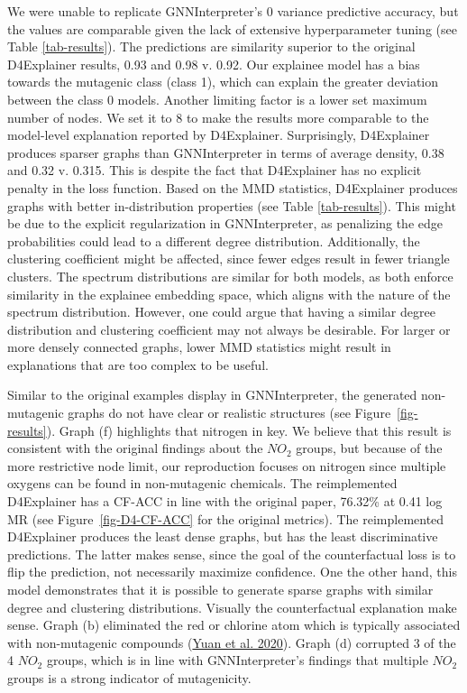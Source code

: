 \documentclass[
  11pt,
  letterpaper,
]{article}
\begin{document}
\quad We were unable to replicate GNNInterpreter's 0 variance predictive
accuracy, but the values are comparable given the lack of extensive
hyperparameter tuning (see Table \ref{tab-results}). The predictions are
similarity superior to the original D4Explainer results, 0.93 and 0.98
v. 0.92. Our explainee model has a bias towards the mutagenic class
(class 1), which can explain the greater deviation between the class 0
models. Another limiting factor is a lower set maximum number of nodes.
We set it to 8 to make the results more comparable to the model-level
explanation reported by D4Explainer. Surprisingly, D4Explainer produces
sparser graphs than GNNInterpreter in terms of average density, 0.38 and
0.32 v. 0.315. This is despite the fact that D4Explainer has no explicit
penalty in the loss function. Based on the MMD statistics, D4Explainer
produces graphs with better in-distribution properties (see Table
\ref{tab-results}). This might be due to the explicit regularization in
GNNInterpreter, as penalizing the edge probabilities could lead to a
different degree distribution. Additionally, the clustering coefficient
might be affected, since fewer edges result in fewer triangle clusters.
The spectrum distributions are similar for both models, as both enforce
similarity in the explainee embedding space, which aligns with the
nature of the spectrum distribution. However, one could argue that
having a similar degree distribution and clustering coefficient may not
always be desirable. For larger or more densely connected graphs, lower
MMD statistics might result in explanations that are too complex to be
useful.

\quad Similar to the original examples display in GNNInterpreter, the
generated non-mutagenic graphs do not have clear or realistic structures
(see Figure~\ref{fig-results}). Graph (f) highlights that nitrogen in
key. We believe that this result is consistent with the original
findings about the \(NO_2\) groups, but because of the more restrictive
node limit, our reproduction focuses on nitrogen since multiple oxygens
can be found in non-mutagenic chemicals. The reimplemented D4Explainer
has a CF-ACC in line with the original paper, 76.32\% at 0.41 log MR
(see Figure~\ref{fig-D4-CF-ACC} for the original metrics). The
reimplemented D4Explainer produces the least dense graphs, but has the
least discriminative predictions. The latter makes sense, since the goal
of the counterfactual loss is to flip the prediction, not necessarily
maximize confidence. One the other hand, this model demonstrates that it
is possible to generate sparse graphs with similar degree and clustering
distributions. Visually the counterfactual explanation make sense. Graph
(b) eliminated the red or chlorine atom which is typically associated
with non-mutagenic compounds
(\protect\hyperlink{ref-Yuan_Tang_Hu_Ji_2020}{Yuan et al. 2020}). Graph
(d) corrupted 3 of the 4 \(NO_2\) groups, which is in line with
GNNInterpreter's findings that multiple \(NO_2\) groups is a strong
indicator of mutagenicity.
\end{document}
